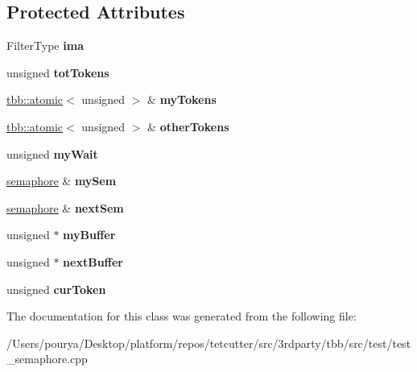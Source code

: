\subsection*{Protected Attributes}
\begin{DoxyCompactItemize}
\item 
\hypertarget{classFilterBase_ada4d39914e34a0bc7ec2dedba1e2f662}{}Filter\+Type {\bfseries ima}\label{classFilterBase_ada4d39914e34a0bc7ec2dedba1e2f662}

\item 
\hypertarget{classFilterBase_a66200608908669803308f4c3236890d3}{}unsigned {\bfseries tot\+Tokens}\label{classFilterBase_a66200608908669803308f4c3236890d3}

\item 
\hypertarget{classFilterBase_aba88e0a80c59f076428c9a2ca792fc60}{}\hyperlink{structtbb_1_1atomic}{tbb\+::atomic}$<$ unsigned $>$ \& {\bfseries my\+Tokens}\label{classFilterBase_aba88e0a80c59f076428c9a2ca792fc60}

\item 
\hypertarget{classFilterBase_abd5df4b7de11fee9248d738bcf3476ee}{}\hyperlink{structtbb_1_1atomic}{tbb\+::atomic}$<$ unsigned $>$ \& {\bfseries other\+Tokens}\label{classFilterBase_abd5df4b7de11fee9248d738bcf3476ee}

\item 
\hypertarget{classFilterBase_a68a356ac20b699e03f2ffa915da8d2b8}{}unsigned {\bfseries my\+Wait}\label{classFilterBase_a68a356ac20b699e03f2ffa915da8d2b8}

\item 
\hypertarget{classFilterBase_a703704e8073aa0a0b58df40376aec37e}{}\hyperlink{classtbb_1_1internal_1_1semaphore}{semaphore} \& {\bfseries my\+Sem}\label{classFilterBase_a703704e8073aa0a0b58df40376aec37e}

\item 
\hypertarget{classFilterBase_a0d78112ea2a79d7e635e2d02fd3e7322}{}\hyperlink{classtbb_1_1internal_1_1semaphore}{semaphore} \& {\bfseries next\+Sem}\label{classFilterBase_a0d78112ea2a79d7e635e2d02fd3e7322}

\item 
\hypertarget{classFilterBase_a4ccfe621cdb3e9df215dacd7eef26311}{}unsigned $\ast$ {\bfseries my\+Buffer}\label{classFilterBase_a4ccfe621cdb3e9df215dacd7eef26311}

\item 
\hypertarget{classFilterBase_a461a9ee2136781b16a7725190d98e3d7}{}unsigned $\ast$ {\bfseries next\+Buffer}\label{classFilterBase_a461a9ee2136781b16a7725190d98e3d7}

\item 
\hypertarget{classFilterBase_aef1d6f1abdfe728ea90ce4fe4c7827ea}{}unsigned {\bfseries cur\+Token}\label{classFilterBase_aef1d6f1abdfe728ea90ce4fe4c7827ea}

\end{DoxyCompactItemize}


The documentation for this class was generated from the following file\+:\begin{DoxyCompactItemize}
\item 
/\+Users/pourya/\+Desktop/platform/repos/tetcutter/src/3rdparty/tbb/src/test/test\+\_\+semaphore.\+cpp\end{DoxyCompactItemize}
